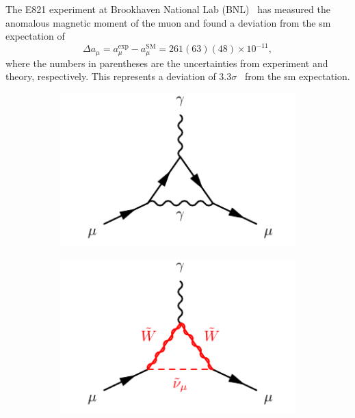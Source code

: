 The E821 experiment at Brookhaven National Lab (BNL)~\cite{Bennett:2006fi} has measured the anomalous magnetic moment of the muon and found a deviation from the \gls{sm} expectation of
\begin{equation}
	\Delta a_\mu = a^\mathrm{exp}_\mu - a^\mathrm{SM}_\mu = 261(63)(48)\times 10^{-11},
\end{equation}
where the numbers in parentheses are the uncertainties from experiment and theory, respectively. This represents a deviation of $3.3\sigma$~\cite{pdg2020} from the \gls{sm} expectation. 

\begin{figure}
	\centering
	\begin{subfigure}[b]{0.33\linewidth}
		\centering\includegraphics[width=1.0\textwidth]{qed_anomalous_moment}
		\caption{\label{fig:qed_anomalous_moment}}
	\end{subfigure}%
	\begin{subfigure}[b]{0.33\linewidth}
		\centering\includegraphics[width=1.0\textwidth]{susy_anomalous_moment_1}

\end{subfigure}
\end{figure}
